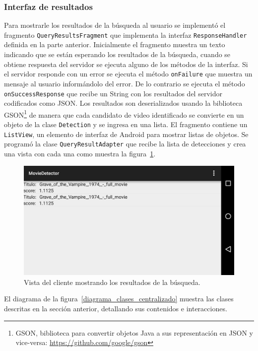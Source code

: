 \subsubsection*{Interfaz de resultados}
Para mostrarle los resultados de la búsqueda al usuario se implementó el fragmento \texttt{QueryResultsFragment} que implementa la interfaz \texttt{ResponseHandler} definida en la parte anterior. Inicialmente el fragmento muestra un texto indicando que se están esperando los resultados de la búsqueda, cuando se obtiene respuesta del servidor se ejecuta alguno de los métodos de la interfaz. Si el servidor responde con un error se ejecuta el método \texttt{onFailure} que muestra un mensaje al usuario informándolo del error. De lo contrario se ejecuta el método \texttt{onSuccessResponse} que recibe un String con los resultados del servidor codificados como JSON. Los resultados son deserializados usando la biblioteca GSON\footnote{GSON, biblioteca para convertir objetos Java a sus representación en JSON y vice-versa: \url{https://github.com/google/gson}} de manera que cada candidato de video identificado se convierte en un objeto de la clase \texttt{Detection} y se ingresa en una lista. El fragmento contiene un \texttt{ListView}, un elemento de interfaz de Android para mostrar listas de objetos. Se programó la clase \texttt{QueryResultAdapter} que recibe la lista de detecciones y crea una vista con cada una como muestra la figura~\ref{pantalla_resultados}.
	\begin{figure}[!h]
		\centering
		\includegraphics[scale=0.3]{imagenes/cap4/pantalla_resultados.png}
		\caption{Vista del cliente mostrando los resultados de la búsqueda.}
		\label{pantalla_resultados}
	\end{figure}
El diagrama de la figura~\ref{diagrama_clases_centralizado} muestra las clases descritas en la sección anterior, detallando sus contenidos e interacciones.
